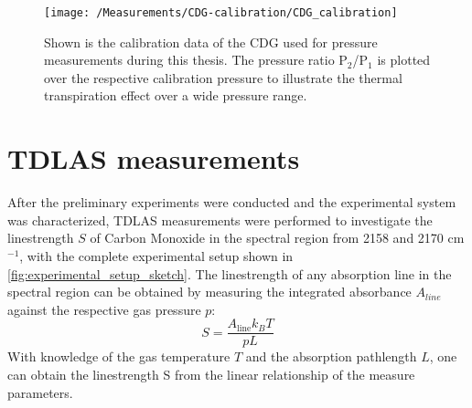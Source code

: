 \begin{figure}[H]
	\centering
	\texttt{[image: /Measurements/CDG-calibration/CDG\_calibration]}
	\caption{Shown is the calibration data of the CDG used for pressure measurements during this thesis. The pressure ratio P$_2$/P$_1$ is plotted over the respective calibration pressure to illustrate the thermal transpiration effect over a wide pressure range.}
	\label{fig:CDG_calibration}
\end{figure}
\section{TDLAS measurements}
After the preliminary experiments were conducted and the experimental system was characterized, TDLAS measurements were performed to investigate the linestrength $S$ of Carbon Monoxide in the spectral region from 2158 and 2170 cm$^{-1}$, with the complete experimental setup shown in \ref{fig:experimental_setup_sketch}. The linestrength of any absorption line in the spectral region can be obtained by measuring the integrated absorbance $A_{line}$ against the respective gas pressure $p$:
\begin{equation}
	S = \frac{A_{\text{line}}  k_B T }{p L}
\end{equation}
\noindent
With knowledge of the gas temperature $T$ and the absorption pathlength $L$, one can obtain the linestrength S from the linear relationship of the measure parameters.
